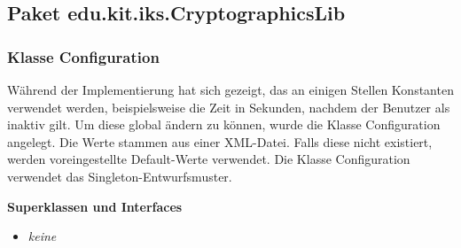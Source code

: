 \documentclass{article}
\begin{document}
  \subsection{Paket edu.kit.iks.CryptographicsLib}
    \subsubsection{Klasse Configuration}
    Während der Implementierung hat sich gezeigt, das an einigen Stellen Konstanten verwendet werden,
    beispielsweise die Zeit in Sekunden, nachdem der Benutzer als inaktiv gilt. Um diese global ändern zu können,
    wurde die Klasse Configuration angelegt. Die Werte stammen aus einer XML-Datei. Falls diese nicht existiert,
    werden voreingestellte Default-Werte verwendet. Die Klasse Configuration verwendet das Singleton-Entwurfsmuster.\newline

    \textbf{Superklassen und Interfaces}
      \begin{itemize}
        \item \textit{keine}
      \end{itemize}
           
\end{document}
